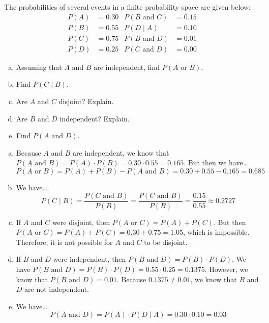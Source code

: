 \documentclass[11pt,letterpaper]{article}
\begin{document}

 The probabilities of several events in a finite probability space are given below:
	\[
	\begin{aligned}
	P(A)&= 0.30 & P(B \text{ and } C)&= 0.15 \\
	P(B)&= 0.55 & P(D \;|\; A)&= 0.10 \\
	P(C)&= 0.75 & P(B \text{ and } D)&= 0.01 \\
	P(D)&= 0.25 & P(C \text{ and } D)&= 0.00
	\end{aligned}
	\] 
\begin{enumerate}[(a)]
\item Assuming that $A$ and $B$ are independent, find $P(A \text{ or } B)$.
\item Find $P(C \;|\; B)$.
\item Are $A$ and $C$ disjoint? Explain.
\item Are $B$ and $D$ independent? Explain. 
\item Find $P(A \text{ and } D)$. 
\end{enumerate} \pspace

\sol 
\begin{enumerate}[(a)]
\item Because $A$ and $B$ are independent, we know that $P(A \text{ and } B)= P(A) \cdot P(B)= 0.30 \cdot 0.55= 0.165$. But then we have\dots
	\[
	P(A \text{ or } B)= P(A) + P(B) - P(A \text{ and } B)= 0.30 + 0.55 - 0.165= 0.685
	\] \pspace

\item We have\dots
	\[
	P(C \;|\; B)= \dfrac{P(C \text{ and } B)}{P(B)}= \dfrac{P(C \text{ and } B)}{P(B)}= \dfrac{0.15}{0.55} \approx 0.2727
	\] \pspace

\item If $A$ and $C$ were disjoint, then $P(A \text{ or } C)= P(A) + P(C)$. But then $P(A \text{ or } C)= P(A) + P(C)= 0.30 + 0.75= 1.05$, which is impossible. Therefore, it is not possible for $A$ and $C$ to be disjoint. \pspace

\item If $B$ and $D$ were independent, then $P(B \text{ and } D)= P(B) \cdot P(D)$. We have $P(B \text{ and } D)= P(B) \cdot P(D)= 0.55 \cdot 0.25= 0.1375$. However, we know that $P(B \text{ and } D)= 0.01$. Because $0.1375 \neq 0.01$, we know that $B$ and $D$ are not independent. \pspace

\item We have\dots
	\[
	P(A \text{ and } D)= P(A) \cdot P(D \;|\; A)= 0.30 \cdot 0.10= 0.03
	\]
\end{enumerate}
\end{document}

